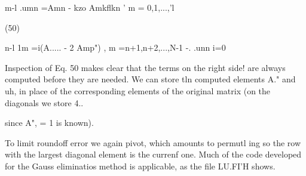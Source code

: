 m-l
.umn =Amn - kzo Amkflkn ' m = 0,1,...,'l

(50)

n-l
1m =i(A..... - 2 Amp") , m =n+1,n+2,...,N-1 -.
.unn i=0

 

Inspection of Eq. 50 makes clear that the terms on the right side!
are always computed before they are needed. We can store tln
computed elements A." and uh, in place of the corresponding
elements of the original matrix (on the diagonals we store  4..

since A", = 1 is known).

To limit roundoff error we again pivot, which amounts to permutl
ing so the row with the largest diagonal element is the currenf
one. Much of the code developed for the Gauss eliminatios
method is applicable, as the file LU.FI'H shows.

